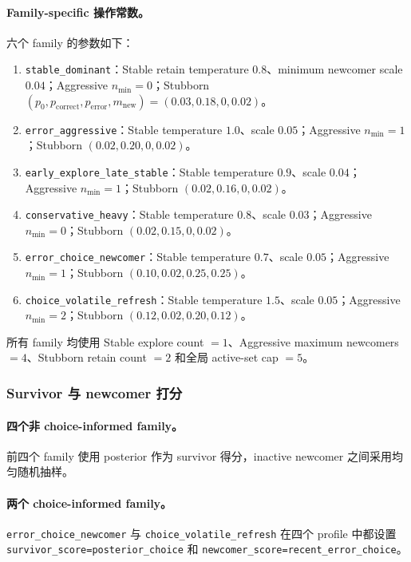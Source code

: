 \paragraph{Family-specific 操作常数。}
六个 family 的参数如下：
\begin{enumerate}
    \item \texttt{stable\_dominant}：Stable retain temperature $0.8$、minimum newcomer scale $0.04$；Aggressive $n_{\min}=0$；Stubborn $(p_0,p_{\mathrm{correct}},p_{\mathrm{error}},m_{\mathrm{new}})=(0.03,0.18,0,0.02)$。
    \item \texttt{error\_aggressive}：Stable temperature $1.0$、scale $0.05$；Aggressive $n_{\min}=1$；Stubborn $(0.02,0.20,0,0.02)$。
    \item \texttt{early\_explore\_late\_stable}：Stable temperature $0.9$、scale $0.04$；Aggressive $n_{\min}=1$；Stubborn $(0.02,0.16,0,0.02)$。
    \item \texttt{conservative\_heavy}：Stable temperature $0.8$、scale $0.03$；Aggressive $n_{\min}=0$；Stubborn $(0.02,0.15,0,0.02)$。
    \item \texttt{error\_choice\_newcomer}：Stable temperature $0.7$、scale $0.05$；Aggressive $n_{\min}=1$；Stubborn $(0.10,0.02,0.25,0.25)$。
    \item \texttt{choice\_volatile\_refresh}：Stable temperature $1.5$、scale $0.05$；Aggressive $n_{\min}=2$；Stubborn $(0.12,0.02,0.20,0.12)$。
\end{enumerate}
所有 family 均使用 Stable explore count $=1$、Aggressive maximum newcomers $=4$、Stubborn retain count $=2$ 和全局 active-set cap $=5$。


\subsubsection{Survivor 与 newcomer 打分}

\paragraph{四个非 choice-informed family。}
前四个 family 使用 posterior 作为 survivor 得分，inactive newcomer 之间采用均匀随机抽样。

\paragraph{两个 choice-informed family。}
\texttt{error\_choice\_newcomer} 与 \texttt{choice\_volatile\_refresh} 在四个 profile 中都设置 \texttt{survivor\_score=posterior\_choice} 和 \texttt{newcomer\_score=recent\_error\_choice}。

